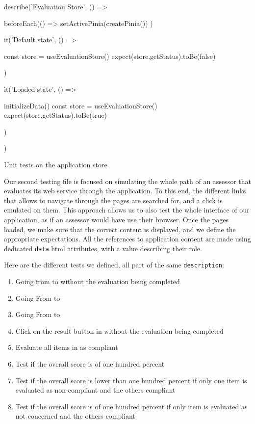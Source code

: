 \begin{listing}[!ht] 
	\begin{javascriptcode}
		describe('Evaluation Store', () => {
			beforeEach(() => {
				setActivePinia(createPinia())
			})
		
			it('Default state', () => {
		
				const store = useEvaluationStore()
				expect(store.getStatus).toBe(false)
		
			})
		
			it('Loaded state', () => {
		
				initializeData()
				const store = useEvaluationStore()
				expect(store.getStatus).toBe(true)
				
			})
		})
	\end{javascriptcode}
	\caption{Unit tests on the application store}
	\label{lst:app_test_store}
\end{listing}

Our second testing file is focused on simulating the whole path of an assessor that evaluates its web service through the application. To this end, the different links that allows to navigate through the pages are searched for, and a click is emulated on them. This approach allows us to also test the whole interface of our application, as if an assessor would have use their browser. Once the pages loaded, we make sure that the correct content is displayed, and we define the appropriate expectations. All the references to application content are made using dedicated \texttt{data} \gls{html} attributes, with a value describing their role. 

Here are the different tests we defined, all part of the same  \texttt{description}:
\begin{enumerate}
	\item Going from  to  without the evaluation being completed
	\item Going From  to 
	\item Going From  to 
	\item Click on the result button in  without the evaluation being completed
	\item Evaluate all items in  as compliant
	\item Test if the overall score is of one hundred percent
	\item Test if the overall score is lower than one hundred percent if only one item is evaluated as non-compliant and the others compliant
	\item Test if the overall score is of one hundred percent if only item is evaluated as not concerned and the others compliant
\end{enumerate}

